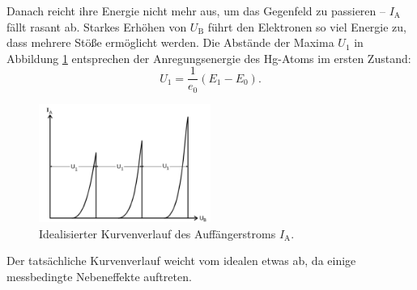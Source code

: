 Danach reicht ihre Energie nicht mehr aus, um das Gegenfeld zu passieren -- $I_\mathup{A}$ fällt rasant ab.
Starkes Erhöhen von $U_\mathup{B}$ führt den Elektronen so viel Energie zu, dass mehrere Stöße ermöglicht werden. 
Die Abstände der Maxima $U_1$ in Abbildung \ref{fig:id} entsprechen der Anregungsenergie des Hg-Atoms im ersten Zustand:
\begin{equation}
	U_1=\frac{1}{e_0}{(E_1-E_0)}.
\end{equation}
\begin{figure}
	\centering
	\includegraphics[width=0.5\textwidth]{Bilder/Kurve_Theo.pdf}
	\caption{Idealisierter Kurvenverlauf des Auffängerstroms $I_\mathup{A}$.\cite{skript}}
	\label{fig:id}
\end{figure}
Der tatsächliche Kurvenverlauf weicht vom idealen etwas ab, da einige messbedingte Nebeneffekte auftreten.

